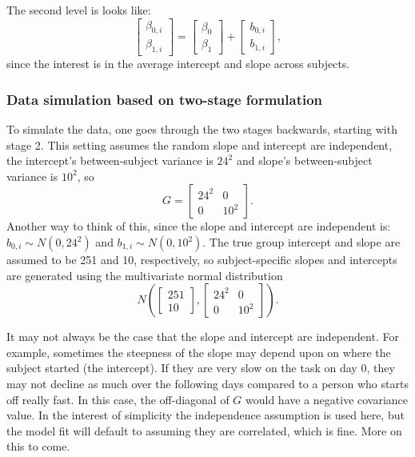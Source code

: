 \documentclass[
]{book}
\begin{document}
The second level is looks like: \[\left[\begin{array}{c}\beta_{0,i} \\ \beta_{1,i}\end{array}\right] =\left[\begin{array}{c}\beta_{0} \\ \beta_{1}\end{array}\right] + \left[\begin{array}{c}b_{0,i} \\ b_{1,i}\end{array}\right],\] since the interest is in the average intercept and slope across subjects.

\hypertarget{data-simulation-based-on-two-stage-formulation}{%
\subsubsection*{Data simulation based on two-stage formulation}\label{data-simulation-based-on-two-stage-formulation}}

To simulate the data, one goes through the two stages backwards, starting with stage 2. This setting assumes the random slope and intercept are independent, the intercept's between-subject variance is \(24^2\) and slope's between-subject variance is \(10^2\), so \[G=\left[\begin{array}{cc} 24^2 & 0 \\ 0 & 10^2 \end{array}\right].\] Another way to think of this, since the slope and intercept are independent is: \(b_{0,i}\sim N(0, 24^2)\) and \(b_{1,i}\sim N(0, 10^2)\). The true group intercept and slope are assumed to be 251 and 10, respectively, so subject-specific slopes and intercepts are generated using the multivariate normal distribution
\[N\left(\left[\begin{array}{c} 251 \\ 10 \end{array}\right], \left[\begin{array}{cc} 24^2 & 0 \\ 0 & 10^2 \end{array}\right]\right).\]

It may not always be the case that the slope and intercept are independent. For example, sometimes the steepness of the slope may depend upon on where the subject started (the intercept). If they are very slow on the task on day 0, they may not decline as much over the following days compared to a person who starts off really fast. In this case, the off-diagonal of \(G\) would have a negative covariance value. In the interest of simplicity the independence assumption is used here, but the model fit will default to assuming they are correlated, which is fine. More on this to come.
\end{document}
